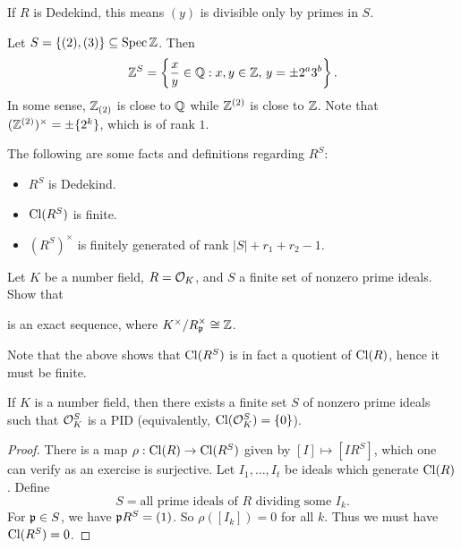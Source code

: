\begin{remark}
  If $R$ is Dedekind, this means $(y)$ is divisible
  only by primes in $S$.
\end{remark}

\begin{example}
  Let $S = \{(2), (3)\} \subseteq \operatorname{Spec} \mathbb{Z}$. Then
  \[
    \mathbb{Z}^S = \left\{
      \frac{x}{y} \in \mathbb{Q} : x, y \in \mathbb{Z},\, y = \pm 2^a 3^b
    \right\}.
  \]
  In some sense, $\mathbb{Z}_{(2)}$ is close to $\mathbb{Q}$ while
  $\mathbb{Z}^{(2)}$ is close to $\mathbb{Z}$. Note that
  $(\mathbb{Z}^{(2)})^\times = \pm \{2^k\}$, which is of
  rank $1$.
\end{example}

\begin{remark}
  The following are some facts and definitions
  regarding $R^S$:
  \begin{itemize}
    \item $R^S$ is Dedekind.
    \item $\operatorname{Cl}(R^S)$ is finite.
    \item $(R^S)^\times$ is finitely generated of
      rank $|S| + r_1 + r_2 - 1$.
  \end{itemize}
\end{remark}

\begin{exercise}
  Let $K$ be a number field, $R = \mathcal{O}_K$, and $S$ a
  finite set of nonzero prime ideals. Show that
  \begin{center}
  \end{center}
  is an exact sequence, where
  $K^\times / R_{\mathfrak{p}}^\times \cong \mathbb{Z}$.
\end{exercise}

\begin{remark}
  Note that the above shows that $\operatorname{Cl}(R^S)$
  is in fact a quotient of $\operatorname{Cl}(R)$, hence it must be
  finite.
\end{remark}

\begin{prop}
  If $K$ is a number field, then there exists a finite
  set $S$ of nonzero prime ideals such that
  $\mathcal{O}_K^S$ is a PID (equivalently, $\operatorname{Cl}(\mathcal{O}_K^S) = \{0\}$).
\end{prop}

\begin{proof}
  There is a map $\rho : \operatorname{Cl}(R) \to \operatorname{Cl}(R^S)$ given by
  $[I] \mapsto [I R^S]$, which one can verify as
  an exercise is surjective. Let $I_1, \dots, I_t$ be
  ideals which generate $\operatorname{Cl}(R)$. Define
  \[
    S = \text{all prime ideals of $R$ dividing some $I_k$}.
  \]
  For $\mathfrak{p} \in S$, we have $\mathfrak{p} R^S = (1)$. So
  $\rho([I_k]) = 0$ for all $k$. Thus we must have
  $\operatorname{Cl}(R^S) = 0$.
\end{proof}

